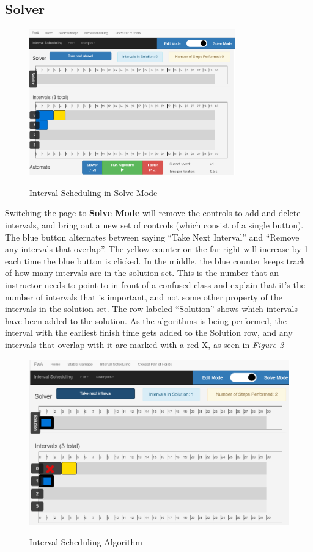 \subsection{Solver}
\begin{figure}[H]
	\caption{Interval Scheduling in Solve Mode}
	\includegraphics[height=2.5in]
	{images/interval-scheduling/interval-scheduling-solve.png}
	\label{fig-interval-scheduling-solve}
	\centering
\end{figure}
 Switching the page to \textbf{Solve Mode} will
 remove the controls to add and delete intervals, and bring out 
 a new set of controls (which consist of a single button). 
 The blue button alternates between saying ``Take Next Interval'' and 
 ``Remove any intervals that overlap''. The yellow counter on the far right 
 will increase by 1 each time the blue button is clicked. 
 In the middle, the blue counter keeps track of how many intervals 
 are in the solution set. This is the number that an instructor needs to point to
 in front of a confused class and explain that it's the number of intervals that 
 is important, and not some other property of the intervals in the solution set. 
 The row labeled ``Solution'' shows which intervals have been added to the solution. 
 \newline\newline
 As the algorithms is being performed, the interval with the earliest finish 
 time gets added to the Solution row, and any intervals that overlap with it are
 marked with a red X, as seen in \textit{Figure \ref{fig-interval-scheduling-algorithm-runtime}}
 	\begin{figure}[H]
 		\caption{Interval Scheduling Algorithm}
 		\includegraphics[width=\linewidth]
 		{images/interval-scheduling/interval-scheduling-algorithm-runtime.png}
 		\label{fig-interval-scheduling-algorithm-runtime}
 		\centering
 	\end{figure}

